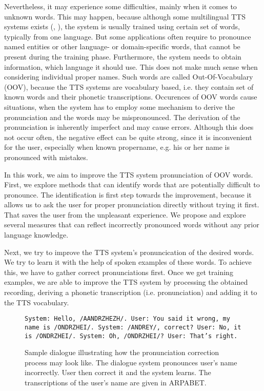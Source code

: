 Nevertheless, it may experience some difficulties, mainly when it comes to unknown words.
This may happen, because although some multilingual TTS systems exists (\cite{sproat1997multilingual}, \cite{miro2009multilingual}), the system is usually trained using certain set of words, typically from one language.
But some applications often require to pronounce named entities or other language- or domain-specific words, that cannot be present during the training phase.
Furthermore, the system needs to obtain information, which language it should use.
This does not make much sense when considering individual proper names.
Such words are called Out-Of-Vocabulary (OOV), because the TTS systems are vocabulary based, i.e. they contain set of known words and their phonetic transcriptions.
Occurences of OOV words cause situations, when the system has to employ some mechanism to derive the pronunciation and the words may be mispronounced.
The derivation of the pronunciation is inherently imperfect and may cause errors.
Although this does not occur often, the negative effect can be quite strong, since it is inconvenient for the user, especially when known propername, e.g. his or her name is pronounced with mistakes.
\par
In this work, we aim to improve the TTS system pronunciation of OOV words.
First, we explore methods that can identify words that are potentially difficult to pronounce.
The identification is first step towards the improvement, because it allows us to ask the user for proper pronunciation directly without trying it first.
That saves the user from the unpleasant experience.
We propose and explore several measures that can reflect incorrectly pronounced words without any prior language knowledge.
\par
Next, we try to improve the TTS system's pronuncication of the desired words.
We try to learn it with the help of spoken examples of these words.
To achieve this, we have to gather correct pronunciations first.
Once we get training examples, we are able to improve the TTS system by processing the obtained recording, deriving a phonetic transcription (i.e. pronunciation) and adding it to the TTS vocabulary.
\par
\begin{center}
\begin{figure}[h]
\texttt{System: Hello, /AANDRZHEZH/.\linebreak
User: You said it wrong, my name is /ONDRZHEI/.\linebreak
System: /ANDREY/, correct?\linebreak
User: No, it is /ONDRZHEI/.\linebreak
System: Oh, /ONDRZHEI/?\linebreak
User: That's right.
}
\caption{Sample dialogue illustrating how the pronunciation correction process may look like. The dialogue system pronounces user's name incorrectly. User then correct it and the system learns. The transcriptions of the user's name are given in ARPABET.}
\label{dialogsample}
\end{figure}
\end{center}
